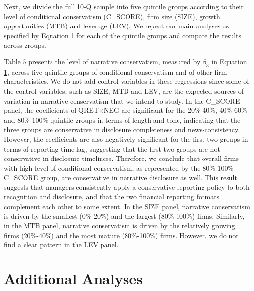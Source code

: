 \documentclass[letterpaper,11pt]{article}
\begin{document}
\begin{spacing}{1.5}
\begin{comment}
	The mean and standard errors of coefficients obtained from \hyperref[eq3]{Equation 3} and the summary statistics of C\_SCORE and G\_SCORE (see \hyperref[oat2]{Table 2 of Online Appendix}) are consistent with \citeA{khanEstimationEmpiricalProperties2009} overall. 
\end{comment}
Next, we divide the full 10-Q sample into five quintile groups according to their level of conditional conservatism (C\_SCORE), firm size (SIZE), growth opportunities (MTB) and leverage (LEV). We repeat our main analyses as specified by \hyperref[eq1]{Equation 1} for each of the quintile groups and compare the results across groups.

\hyperref[T5]{Table 5} presents the level of narrative conservatism, measured by $\beta_3$ in \hyperref[eq1]{Equation 1}, across five quintile groups of conditional conservatism and of other firm characteristics. We do not add control variables in these regressions since some of the control variables, such as SIZE, MTB and LEV, are the expected sources of variation in narrative conservatism that we intend to study. In the C\_SCORE panel, the coefficients of QRET$\times$NEG are significant for the 20\%-40\%, 40\%-60\% and 80\%-100\% quintile groups in terms of length and tone, indicating that the three groups are conservative in disclosure completeness and news-consistency. However, the coefficients are also negatively significant for the first two groups in terms of reporting time lag, suggesting that the first two groups are not conservative in disclosure timeliness. Therefore, we conclude that overall firms with high level of conditional conservatism, as represented by the 80\%-100\% C\_SCORE group, are conservative in narrative disclosure as well. This result suggests that managers consistently apply a conservative reporting policy to both recognition and disclosure, and that the two financial reporting formats complement each other to some extent. In the SIZE panel, narrative conservatism is driven by the smallest (0\%-20\%) and the largest (80\%-100\%) firms. Similarly, in the MTB panel, narrative conservatism is driven by the relatively growing firms (20\%-40\%) and the most mature (80\%-100\%) firms. However, we do not find a clear pattern in the LEV panel.  

\section{Additional Analyses}

\end{spacing}
\end{document}
